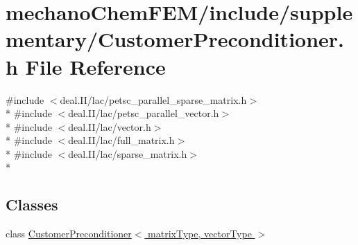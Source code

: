\section{mechano\-Chem\-F\-E\-M/include/supplementary/\-Customer\-Preconditioner.h File Reference}
\label{_customer_preconditioner_8h}
{\ttfamily \#include $<$deal.\-I\-I/lac/petsc\-\_\-parallel\-\_\-sparse\-\_\-matrix.\-h$>$}\\*
{\ttfamily \#include $<$deal.\-I\-I/lac/petsc\-\_\-parallel\-\_\-vector.\-h$>$}\\*
{\ttfamily \#include $<$deal.\-I\-I/lac/vector.\-h$>$}\\*
{\ttfamily \#include $<$deal.\-I\-I/lac/full\-\_\-matrix.\-h$>$}\\*
{\ttfamily \#include $<$deal.\-I\-I/lac/sparse\-\_\-matrix.\-h$>$}\\*
\subsection*{Classes}
\begin{DoxyCompactItemize}
\item 
class \hyperlink{class_customer_preconditioner}{Customer\-Preconditioner$<$ matrix\-Type, vector\-Type $>$}
\end{DoxyCompactItemize}
